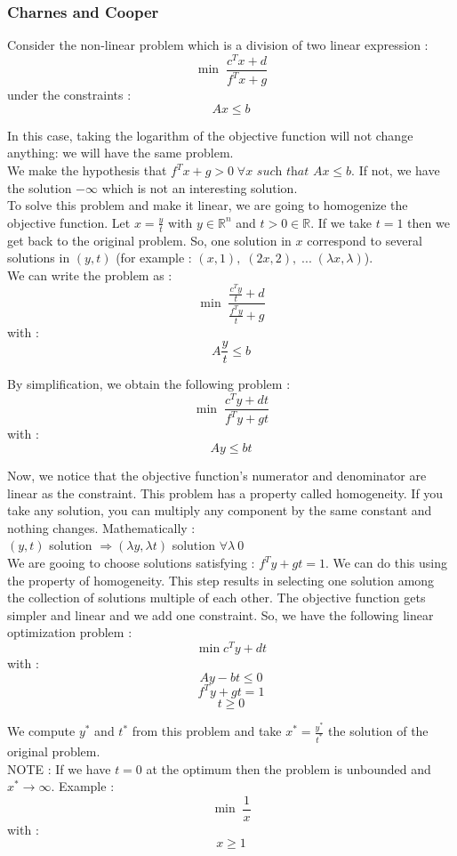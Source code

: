 \documentclass{article}
\begin{document}
\subsubsection{Charnes and Cooper}

Consider the non-linear problem which is a division of two linear expression : 
$$ \min \; \frac{c^{T}x + d}{f^{T}x + g}$$
under the constraints : 
$$ Ax \leq b$$

In this case, taking the logarithm of the objective function will not change anything: we will have the same problem. \\

We make the hypothesis that $f^{T}x+g > 0 \; \forall x \textit{ such that } Ax \leq b$. If not, we have the solution $-\infty$ which is not an interesting solution. \\

To solve this problem and make it linear, we are going to homogenize the objective function. Let $x = \frac{y}{t}$ with $y \in \mathbb{R}^{n}$ and $t >0 \in \mathbb{R}$. If we take $t=1$ then we get back to the original problem. So, one solution in $x$ correspond to several solutions in $(y,t)$ (for example : $(x,1), \; (2x,2), \; ... \; (\lambda x,\lambda)$).\\
We can write the problem as : 
$$ \min \; \frac{\frac{c^{T}y}{t}+d}{\frac{f^{T}y}{t}+g} $$
with : 
$$ A\frac{y}{t} \leq b$$

By simplification, we obtain the following problem : 
$$ \min \; \frac{c^{T}y + dt}{f^{T}y + gt}$$
with :
$$Ay \leq bt$$

Now, we notice that the objective function's numerator and denominator are linear as the constraint. This problem has a property called homogeneity. If you take any solution, you can multiply any component by the same constant and nothing changes. Mathematically : \\
$(y,t)$ solution $\Rightarrow (\lambda y, \lambda t)$ solution $\forall \lambda \ 0$ \\

We are gooing to choose solutions satisfying : $f^{T}y+gt=1$. We can do this using the property of homogeneity. This step results in selecting one solution among the collection of solutions multiple of each other. The objective function gets simpler and linear and we add one constraint. So, we have the following linear optimization problem : 
$$ \min c^{T}y + dt$$
with : 
$$ Ay-bt \leq 0$$
$$f^{T}y+gt = 1$$
$$t \geq 0$$

We compute $y^{*}$ and $t^{*}$ from this problem and take $x^{*} = \frac{y^{*}}{t^{*}}$ the solution of the original problem.\\ NOTE : If we have $t=0$ at the optimum then the problem is unbounded and $x^{*} \rightarrow \infty$. Example : 
$$ \min \; \frac{1}{x}$$
with : 
$$x \geq 1$$ 
\end{document}
